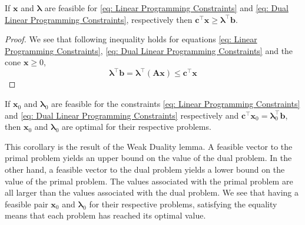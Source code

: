 \begin{lemma}
If $\mathbf{x}$ and $\pmb{\lambda}$ are feasible for \eqref{eq: Linear Programming Constraints} and \eqref{eq: Dual Linear Programming Constraints}, respectively then $\mathbf{c}^\top\mathbf{x}\geq \pmb{\lambda}^\top\mathbf{b}$.
\end{lemma}

\begin{proof}
	We see that following inequality holds for equations \eqref{eq: Linear Programming Constraints}, \eqref{eq: Dual Linear Programming Constraints} and the cone $\mathbf{x}\geq 0$,
	\begin{equation*}
			\pmb{\lambda}^\top \mathbf{b}=\pmb{\lambda}^\top\left(\mathbf{Ax}\right)\leq \mathbf{c}^\top\mathbf{x}
	\end{equation*}
\end{proof}

\begin{corollary}
	\label{cor: Dual Primal equality}
	If $\mathbf{x}_0$ and $\pmb{\lambda}_0$ are feasible for the constraints \eqref{eq: Linear Programming Constraints} and \eqref{eq: Dual Linear Programming Constraints} respectively and  $\mathbf{c}^\top \mathbf{x}_0=\pmb{\lambda}_0^\top\mathbf{b}$, then $\mathbf{x}_0$ and $\pmb{\lambda}_0$ are optimal for their respective problems.
\end{corollary}

This corollary is the result of the Weak Duality lemma. A feasible vector to the primal problem yields an upper bound on the value of the dual problem. In the other hand, a feasible vector to the dual problem yields a lower bound on the value of the primal problem. The values associated with the primal problem are all larger than the values associated with the dual problem. We see that having a feasible pair $\mathbf{x}_0$ and $\pmb{\lambda}_0$ for their respective problems, satisfying the equality means that each problem has reached its optimal value. 

